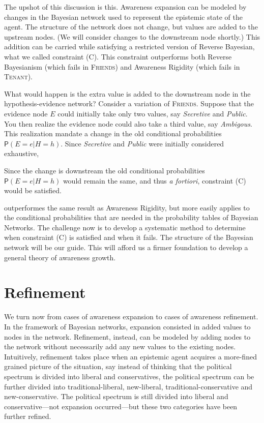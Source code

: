 \documentclass[
  11pt,
  dvipsnames,enabledeprecatedfontcommands]{scrartcl}
\newcommand{\pr}[1]{\ensuremath{\mathsf{P}(#1)}}
\begin{document}
The upshot of this discussion is this. Awareness expansion can be
modeled by changes in the Bayesian network used to represent the
epistemic state of the agent. The structure of the network does not
change, but values are added to the upstream nodes. (We will consider
changes to the downstream node shortly.) This addition can be carried
while satisfying a restricted version of Reverse Bayesian, what we
called constraint (C). This constraint outperforms both Reverse
Bayesianism (which fails in \textsc{Friends}) and Awareness Rigidity
(which fails in \textsc{Tenant}).

What would happen is the extra value is added to the downstream node in
the hypothesis-evidence network? Consider a variation of
\textsc{Friends}. Suppose that the evidence node \(E\) could initially
take only two values, say \textit{Secretive} and \textit{Public}. You
then realize the evidence node could also take a third value, say
\textit{Ambigous}. This realization mandate a change in the old
conditional probabilities \(\pr{E=e \vert H=h}\). Since
\textit{Secretive} and \textit{Public} were initially considered
exhaustive,

Since the change is downstream the old conditional probabilities
\(\pr{E=e \vert H=h}\) would remain the same, and thus \emph{a
fortiori}, constraint (C) would be satisfied.

outperformes the same result as Awareness Rigidity, but more easily
applies to the conditional probabilities that are needed in the
probability tables of Bayesian Networks. The challenge now is to develop
a systematic method to determine when constraint (C) is satisfied and
when it fails. The structure of the Bayesian network will be our guide.
This will afford us a firmer foundation to develop a general theory of
awareness growth.

\hypertarget{refinement}{%
\section{Refinement}\label{refinement}}

\label{sec:structural-both}

We turn now from cases of awareness expansion to cases of awareness
refinement. In the framework of Bayesian networks, expansion consisted
in added values to nodes in the network. Refinement, instead, can be
modeled by adding nodes to the network without necessarily add any new
values to the existing nodes. Intuitively, refinement takes place when
an epistemic agent acquires a more-fined grained picture of the
situation, say instead of thinking that the political spectrum is
divided into liberal and conservatives, the political spectrum can be
further divided into traditional-liberal, new-liberal,
traditional-conservative and new-conservative. The political spectrum is
still divided into liberal and conservative---not expansion
occurred---but these two categories have been further refined.
\end{document}
